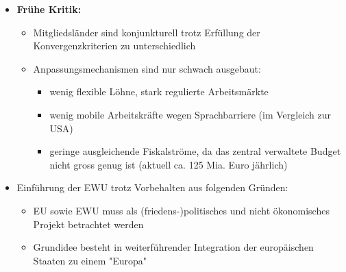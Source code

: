 \begin{itemize}
	\item \textbf{Frühe Kritik:}
	\begin{itemize}
		\item Mitgliedsländer sind konjunkturell trotz Erfüllung der Konvergenzkriterien zu unterschiedlich
		\item Anpassungsmechanismen sind nur schwach ausgebaut:
		\begin{itemize}
			\item wenig flexible Löhne, stark regulierte Arbeitsmärkte
			\item wenig mobile Arbeitskräfte wegen Sprachbarriere (im Vergleich zur USA)
			\item geringe ausgleichende Fiskalströme, da das zentral verwaltete Budget nicht gross genug ist (aktuell ca. 125 Mia. Euro jährlich)
		\end{itemize}
	\end{itemize}
	\item Einführung der EWU trotz Vorbehalten aus folgenden Gründen:
	\begin{itemize}
		\item EU sowie EWU muss als (friedens-)politisches und nicht ökonomisches Projekt betrachtet werden
		\item Grundidee besteht in weiterführender Integration der europäischen Staaten zu einem "Europa"
	\end{itemize}
\end{itemize}
